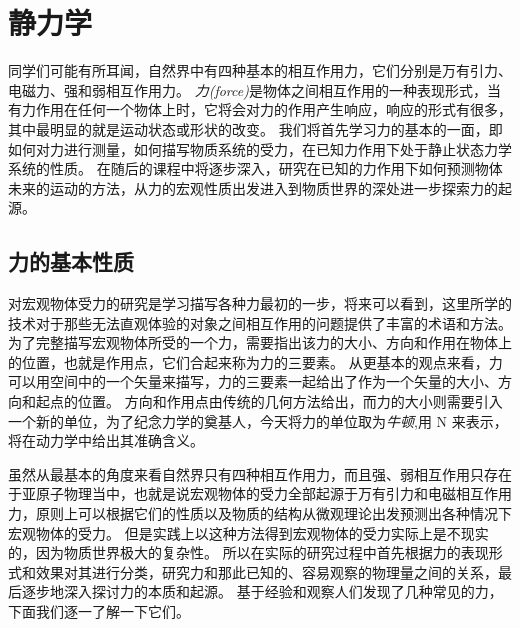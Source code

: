 
\chapter{静力学}

同学们可能有所耳闻，自然界中有四种基本的相互作用力，它们分别是万有引力、电磁力、强和弱相互作用力。
\emph{力(force)}是物体之间相互作用的一种表现形式，当有力作用在任何一个物体上时，它将会对力的作用产生响应，响应的形式有很多，其中最明显的就是运动状态或形状的改变。
我们将首先学习力的基本的一面，即如何对力进行测量，如何描写物质系统的受力，在已知力作用下处于静止状态力学系统的性质。
在随后的课程中将逐步深入，研究在已知的力作用下如何预测物体未来的运动的方法，从力的宏观性质出发进入到物质世界的深处进一步探索力的起源。


\section{力的基本性质}

对宏观物体受力的研究是学习描写各种力最初的一步，将来可以看到，这里所学的技术对于那些无法直观体验的对象之间相互作用的问题提供了丰富的术语和方法。
为了完整描写宏观物体所受的一个力，需要指出该力的大小、方向和作用在物体上的位置，也就是作用点，它们合起来称为力的三要素。
从更基本的观点来看，力可以用空间中的一个矢量来描写，力的三要素一起给出了作为一个矢量的大小、方向和起点的位置。
方向和作用点由传统的几何方法给出，而力的大小则需要引入一个新的单位，为了纪念力学的奠基人，今天将力的单位取为\emph{牛顿},用 N 来表示，将在动力学中给出其准确含义。

虽然从最基本的角度来看自然界只有四种相互作用力，而且强、弱相互作用只存在于亚原子物理当中，也就是说宏观物体的受力全部起源于万有引力和电磁相互作用力，原则上可以根据它们的性质以及物质的结构从微观理论出发预测出各种情况下宏观物体的受力。
但是实践上以这种方法得到宏观物体的受力实际上是不现实的，因为物质世界极大的复杂性。
所以在实际的研究过程中首先根据力的表现形式和效果对其进行分类，研究力和那此已知的、容易观察的物理量之间的关系，最后逐步地深入探讨力的本质和起源。
基于经验和观察人们发现了几种常见的力，下面我们逐一了解一下它们。

